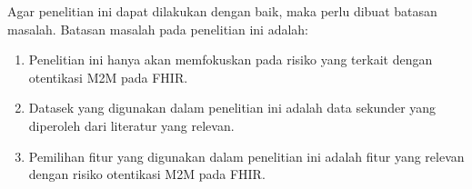 Agar penelitian ini dapat dilakukan dengan baik, maka perlu dibuat batasan masalah. Batasan masalah pada penelitian ini adalah:

\begin{enumerate}
    \item Penelitian ini hanya akan memfokuskan pada risiko yang terkait dengan otentikasi M2M pada FHIR.
    \item Datasek yang digunakan dalam penelitian ini adalah data sekunder yang diperoleh dari literatur yang relevan.
    \item Pemilihan fitur yang digunakan dalam penelitian ini adalah fitur yang relevan dengan risiko otentikasi M2M pada FHIR.
\end{enumerate}